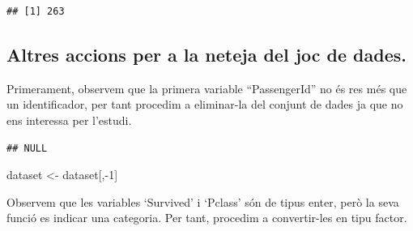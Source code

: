 \documentclass[
]{article}
\newenvironment{Shaded}{\begin{snugshade}}{\end{snugshade}}
\newcommand{\CommentTok}[1]{\textcolor[rgb]{0.50,0.62,0.50}{#1}}
\newcommand{\DecValTok}[1]{\textcolor[rgb]{0.86,0.86,0.80}{#1}}
\newcommand{\FunctionTok}[1]{\textcolor[rgb]{0.94,0.94,0.56}{#1}}
\newcommand{\NormalTok}[1]{\textcolor[rgb]{0.80,0.80,0.80}{#1}}
\newcommand{\OtherTok}[1]{\textcolor[rgb]{0.94,0.94,0.56}{#1}}
\newcommand{\SpecialCharTok}[1]{\textcolor[rgb]{0.86,0.64,0.64}{#1}}
\begin{document}
\begin{verbatim}
## [1] 263
\end{verbatim}

\begin{Shaded}
\end{Shaded}

\hypertarget{altres-accions-per-a-la-neteja-del-joc-de-dades.}{%
\subsection{Altres accions per a la neteja del joc de
dades.}\label{altres-accions-per-a-la-neteja-del-joc-de-dades.}}

Primerament, observem que la primera variable ``PassengerId'' no és res
més que un identificador, per tant procedim a eliminar-la del conjunt de
dades ja que no ens interessa per l'estudi.

\begin{Shaded}
\end{Shaded}

\begin{verbatim}
## NULL
\end{verbatim}

\begin{Shaded}
\begin{Highlighting}[]
\NormalTok{dataset }\OtherTok{\textless{}{-}}\NormalTok{ dataset[,}\SpecialCharTok{{-}}\DecValTok{1}\NormalTok{]}
\end{Highlighting}
\end{Shaded}

Observem que les variables `Survived' i `Pclass' són de tipus enter,
però la seva funció es indicar una categoria. Per tant, procedim a
convertir-les en tipu factor.
\end{document}
